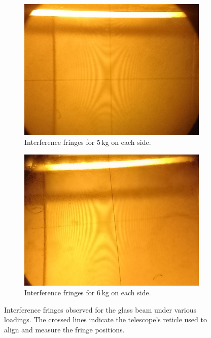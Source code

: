 \documentclass[a4paper,11pt]{article}
\begin{document}
\begin{figure}[H]
  \vspace{1em} %
  
  \begin{subfigure}[b]{0.45\textwidth}
    \centering
    \includegraphics[width=\textwidth]{5.jpg}
    \caption{Interference fringes for 5\,kg on each side.}
    \label{fig:fringes_5kg}
  \end{subfigure}
  \hfill
  \begin{subfigure}[b]{0.45\textwidth}
    \centering
    \includegraphics[width=\textwidth]{6.jpg}
    \caption{Interference fringes for 6\,kg on each side.}
    \label{fig:fringes_6kg}
  \end{subfigure}
  
  \caption{Interference fringes observed for the glass beam under various loadings. The crossed lines indicate the telescope's reticle used to align and measure the fringe positions.}
  \label{fig:fringes_combined}
\end{figure}
\end{document}
